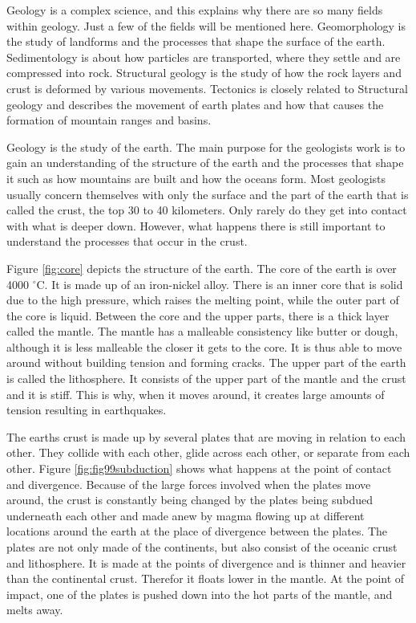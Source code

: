 \documentclass[a4paper,12pt]{report}
\begin{document}
Geology is a complex science, and this explains why there are so many fields within geology. Just a few of the fields will be mentioned here. Geomorphology is the study of landforms and the processes that shape the surface of the earth. Sedimentology is about how particles are transported, where they settle and are compressed into rock. Structural geology is the study of how the rock layers and crust is deformed by various movements. Tectonics is closely related to Structural geology and describes the movement of earth plates and how that causes the formation of mountain ranges and basins.

Geology is the study of the earth. The main purpose for the geologists work is to gain an understanding of the structure of the earth and the processes that shape it such as how mountains are built and how the oceans form. Most geologists usually concern themselves with only the surface and the part of the earth that is called the crust, the top 30 to 40 kilometers. Only rarely do they get into contact with what is deeper down. However, what happens there is still important to understand the processes that occur in the crust. 

Figure \ref{fig:core} depicts the structure of the earth. The core of the earth is over 4000 $^\circ$C. It is made up of an iron-nickel alloy. There is an inner core that is solid due to the high pressure, which raises the melting point, while the outer part of the core is liquid. Between the core and the upper parts, there is a thick layer called the mantle. The mantle has a malleable consistency like butter or dough, although it is less malleable the closer it gets to the core. It is thus able to move around without building tension and forming cracks. The upper part of the earth is called the lithosphere. It consists of the upper part of the mantle and the crust and it is stiff. This is why, when it moves around, it creates large amounts of tension resulting in earthquakes.

The earths crust is made up by several plates that are moving in relation to each other. They collide with each other, glide across each other, or separate from each other. Figure \ref{fig:fig99subduction} shows what happens at the point of contact and divergence.  Because of the large forces involved when the plates move around, the crust is constantly being changed by the plates being subdued underneath each other and made anew by magma flowing up at different locations around the earth at the place of divergence between the plates. The plates are not only made of the continents, but also consist of the oceanic crust and lithosphere. It is made at the points of divergence and is thinner and heavier than the continental crust. Therefor it floats lower in the mantle. At the point of impact, one of the plates is pushed down into the hot parts of the mantle, and melts away.
\end{document}
